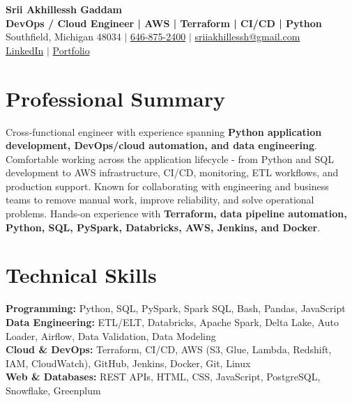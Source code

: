 \documentclass[letterpaper,10pt]{article}
\begin{document}
\fontsize{9.35pt}{10.45pt}\selectfont

\begin{center}
    {\LARGE \textbf{Srii Akhillessh Gaddam}} \\[-1pt]
    \textbf{DevOps / Cloud Engineer | AWS | Terraform | CI/CD | Python} \\[2pt]
    Southfield, Michigan 48034 $|$
    \href{tel:6468752400}{646-875-2400} $|$
    \href{mailto:sriiakhillessh@gmail.com}{sriiakhillessh@gmail.com} \\[1pt]
    \href{https://www.linkedin.com/in/srii-akhiilessh-gaddam-b48668191/}{LinkedIn} $|$
    \href{https://sriiakhillesshg.github.io/portfolio/}{Portfolio}
\end{center}
\vspace{-8pt}

\section{Professional Summary}
\small{Cross-functional engineer with experience spanning \textbf{Python application development, DevOps/cloud automation, and data engineering}. Comfortable working across the application lifecycle - from Python and SQL development to AWS infrastructure, CI/CD, monitoring, ETL workflows, and production support. Known for collaborating with engineering and business teams to remove manual work, improve reliability, and solve operational problems. Hands-on experience with \textbf{Terraform, data pipeline automation, Python, SQL, PySpark, Databricks, AWS, Jenkins, and Docker}.}

\section{Technical Skills}
\small{
\textbf{Programming:} Python, SQL, PySpark, Spark SQL, Bash, Pandas, JavaScript \\
\textbf{Data Engineering:} ETL/ELT, Databricks, Apache Spark, Delta Lake, Auto Loader, Airflow, Data Validation, Data Modeling \\
\textbf{Cloud \& DevOps:} Terraform, CI/CD, AWS (S3, Glue, Lambda, Redshift, IAM, CloudWatch), GitHub, Jenkins, Docker, Git, Linux \\
\textbf{Web \& Databases:} REST APIs, HTML, CSS, JavaScript, PostgreSQL, Snowflake, Greenplum
}
\end{document}
